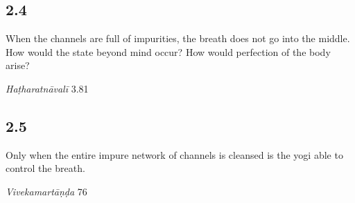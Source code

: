 \begin{ekdosis}
\subsection*{2.4}
\begin{translation}[hp02_004]
When the channels are full of impurities, the breath does not go into the middle. How would the state beyond mind occur? How would perfection of the body arise?
\end{translation}


\begin{testimonia}[hp02_004]
\emph{Haṭharatnāvalī} 3.81

\begin{versinnote}
\end{versinnote}
\end{testimonia}


\subsection*{2.5}
\begin{translation}[hp02_005]
Only when the entire impure network of channels is cleansed is the yogi able to control the breath.
\end{translation}

\begin{sources}[hp02_005]
\emph{Vivekamartāṇḍa} 76

\begin{versinnote}
\end{versinnote}
\end{sources}


\end{ekdosis}
